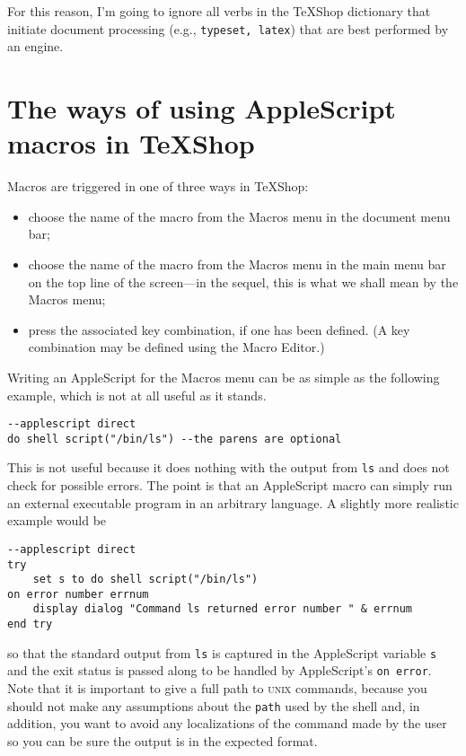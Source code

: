 \documentclass[11pt]{amsart}
\def\TeXShop{\TeX Shop\xspace}
\def\UNIX{\textsc{unix}\xspace}
\def\Macros{\textsf{Macros}\xspace}
\begin{document}
For this reason, I'm going to ignore all verbs in the \TeXShop dictionary that initiate document processing (e.g., {\tt typeset, latex}) that are best performed by an engine.

\section{The ways of using AppleScript macros in \TeXShop}
Macros are triggered in one of three ways in \TeXShop:
\begin{itemize}
\item
choose the name of the macro from the \textsf{Macros} menu in the document menu bar;
\item
choose the name of the macro from the \textsf{Macros} menu in the main menu bar on the top line of the screen---in the sequel, this is what we shall mean by the \textsf{Macros} menu;
\item press the associated key combination, if one has been defined. (A key combination may be defined using the \textsf{Macro Editor}.)
\end{itemize}
Writing an AppleScript for the \Macros menu can be as simple as the following example, which is not at all useful as it stands.
\begin{verbatim}
--applescript direct
do shell script("/bin/ls") --the parens are optional
\end{verbatim}
This is not useful because it does nothing with the output from {\tt ls} and does not check for possible errors. The point is that an AppleScript macro can simply run an external executable program in an arbitrary language. A slightly more realistic example would be
\begin{verbatim}
--applescript direct
try
    set s to do shell script("/bin/ls")
on error number errnum
    display dialog "Command ls returned error number " & errnum
end try
\end{verbatim}
so that the standard output from {\tt ls} is captured in the AppleScript variable {\tt s} and the exit status is passed along to be handled by AppleScript's {\tt on error}. Note that it is important to give a full path to \UNIX commands, because you should not make any assumptions about the {\tt path} used by the shell and, in addition, you want to avoid any localizations of the command made by the user so you can be sure the output is in the expected format.
\end{document}
